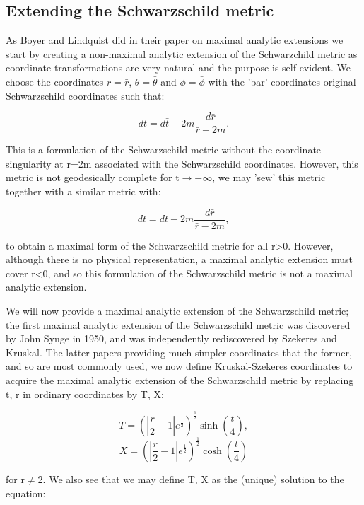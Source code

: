 \documentclass[oneside,openright,frontopenright, singlespacing]{dmathesis}
\begin{document}
\subsection{Extending the Schwarzschild metric}\label{subsec:Subsection6.1.1}

\vspace{1em}
	As Boyer and Lindquist did in their paper on maximal analytic extensions\cite{boyer1967maximal} we start by creating a non-maximal analytic extension of the Schwarzchild metric as coordinate transformations are very natural and the purpose is self-evident. We choose the coordinates $r=\bar{r}$, $\theta=\bar{\theta}$ and $\phi=\bar{\phi}$ with the 'bar' coordinates original Schwarzschild coordinates such that:

	\[dt = d\bar{t}+2m\frac{d\bar{r}}{\bar{r}-2m}.\]

\vspace{1em}
	This is a formulation of the Schwarzschild metric without the coordinate singularity at r=2m associated with the Schwarzschild coordinates. However, this metric is not geodesically complete for t$\rightarrow-\infty$, we may 'sew' this metric together with a similar metric with:

	\[dt = d\bar{t}-2m\frac{d\bar{r}}{\bar{r}-2m},\]

	to obtain a maximal form of the Schwarzschild metric for all r>0. However, although there is no physical representation, a maximal analytic extension must cover r<0, and so this formulation of the Schwarzschild metric is not a maximal analytic extension.

\vspace{1em}
	We will now provide a maximal analytic extension of the Schwarzschild metric; the first maximal analytic extension of the Schwarzschild metric was discovered by John Synge in 1950\cite{synge1950gravitational}, and was independently rediscovered by Szekeres\cite{szekeres1960singularities} and Kruskal\cite{kruskal1960maximal}. The latter papers providing much simpler coordinates that the former, and so are most commonly used, we now define Kruskal-Szekeres coordinates to acquire the maximal analytic extension of the Schwarzschild metric by replacing t, r in ordinary coordinates by T, X:

	\[T=(|\frac{r}{2}-1|e^{\frac{1}{2}})^{\frac{1}{2}}\sinh\left(\frac{t}{4}\right),\]
	\[X=(|\frac{r}{2}-1|e^{\frac{1}{2}})^{\frac{1}{2}}\cosh\left(\frac{t}{4}\right)\]

\vspace{1em}
	for r$\neq$2. We also see that we may define T, X as the (unique) solution to the equation:
\end{document}
